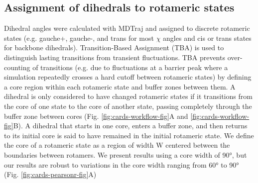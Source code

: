 \documentclass[../main.tex]{subfiles}
\begin{document}
    \subsection{Assignment of dihedrals to rotameric states}
        Dihedral angles were calculated with MDTraj \cite{McGibbon:2015fv} and assigned to discrete rotameric states (e.g. gauche+, gauche-, and trans for most $\chi$ angles and cis or trans states for backbone dihedrals). Transition-Based Assignment (TBA) is used to distinguish lasting transitions from transient fluctuations\cite{Hummer:2004kb,Bolhuis:2002ew,Buchete:2008hb,Schutte:2011gs}. TBA prevents over-counting of transitions (e.g. due to fluctuations at a barrier peak where a simulation repeatedly crosses a hard cutoff between rotameric states) by defining a core region within each rotameric state and buffer zones between them. A dihedral is only considered to have changed rotameric states if it transitions from the core of one state to the core of another state, passing completely through the buffer zone between cores (Fig. \ref{fig:cards-workflow-fig}A and \ref{fig:cards-workflow-fig}B). A dihedral that starts in one core, enters a buffer zone, and then returns to its initial core is said to have remained in the initial rotameric state. We define the core of a rotameric state as a region of width W centered between the boundaries between rotamers. We present results using a core width of 90°, but our results are robust to variations in the core width ranging from 60° to 90° (Fig. \ref{fig:cards-pearsonr-fig}A)
\end{document}
